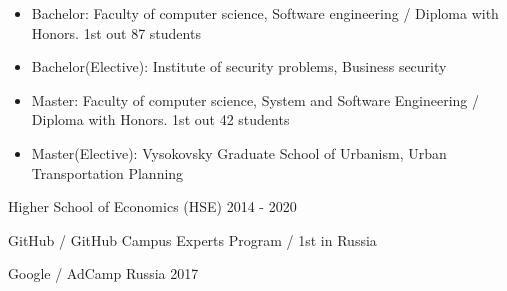 \vspace{-0.3cm}

\cventryeducation
{
\vspace{-0.4cm}
\begin{itemize}
\item Bachelor: Faculty of computer science, Software engineering / Diploma with Honors. 1st out 87 students
\item Bachelor(Elective): Institute of security problems, Business security
\item Master: Faculty of computer science, System and Software Engineering / Diploma with Honors. 1st out 42 students
\item Master(Elective): Vysokovsky Graduate School of Urbanism, Urban Transportation Planning
\end{itemize}
} %
{Higher School of Economics (HSE)} %
{} %
{2014 - 2020} %

\vspace{-0.5cm}
\cventryeducation
{} %
{GitHub / GitHub Campus Experts Program / 1st in Russia} %
{} %
{} %

\vspace{-0.5cm}
\cventryeducation
{} %
{Google / AdCamp Russia 2017} %
{} %
{} %
